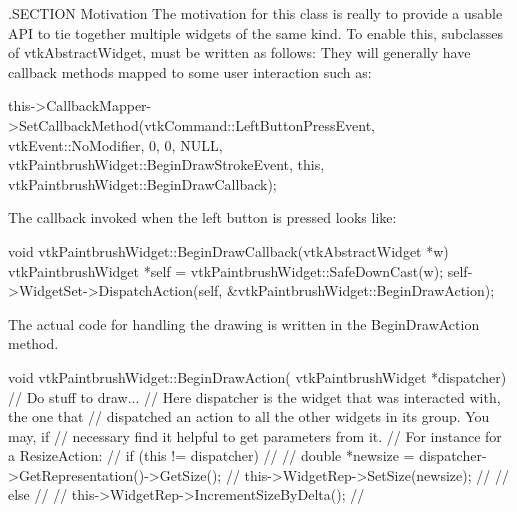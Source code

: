 .S\-E\-C\-T\-I\-O\-N Motivation The motivation for this class is really to provide a usable A\-P\-I to tie together multiple widgets of the same kind. To enable this, subclasses of vtk\-Abstract\-Widget, must be written as follows\-: They will generally have callback methods mapped to some user interaction such as\-: \begin{DoxyVerb} this->CallbackMapper->SetCallbackMethod(vtkCommand::LeftButtonPressEvent,
                         vtkEvent::NoModifier, 0, 0, NULL, 
                         vtkPaintbrushWidget::BeginDrawStrokeEvent,
                         this, vtkPaintbrushWidget::BeginDrawCallback);\end{DoxyVerb}
 The callback invoked when the left button is pressed looks like\-: \begin{DoxyVerb} void vtkPaintbrushWidget::BeginDrawCallback(vtkAbstractWidget *w)
 {
   vtkPaintbrushWidget *self = vtkPaintbrushWidget::SafeDownCast(w);
   self->WidgetSet->DispatchAction(self, &vtkPaintbrushWidget::BeginDrawAction);
 }\end{DoxyVerb}
 The actual code for handling the drawing is written in the Begin\-Draw\-Action method. \begin{DoxyVerb} void vtkPaintbrushWidget::BeginDrawAction( vtkPaintbrushWidget *dispatcher)
 {
 // Do stuff to draw... 
 // Here dispatcher is the widget that was interacted with, the one that
 // dispatched an action to all the other widgets in its group. You may, if
 // necessary find it helpful to get parameters from it.
 //   For instance for a ResizeAction:
 //     if (this != dispatcher)
 //       {
 //       double *newsize = dispatcher->GetRepresentation()->GetSize();
 //       this->WidgetRep->SetSize(newsize);
 //       }
 //     else
 //       {
 //       this->WidgetRep->IncrementSizeByDelta();
 //       }
 }\end{DoxyVerb}


